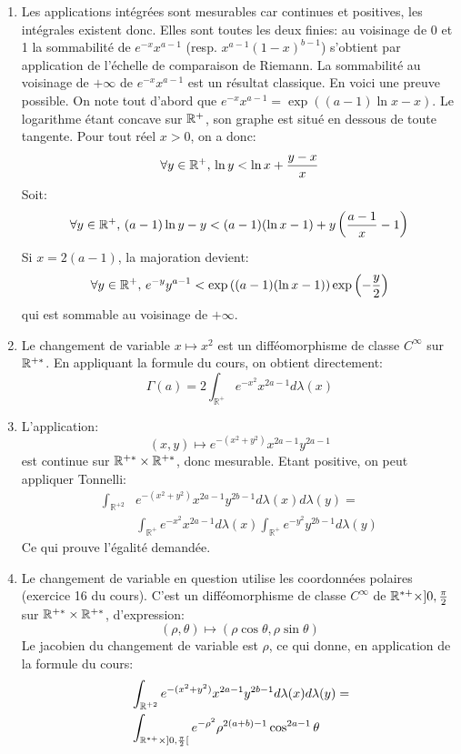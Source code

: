\documentclass[a4paper, 12pt]{amsart}
\begin{document}
\begin{enumerate}
 \item Les applications intégrées sont mesurables car continues et positives,
les intégrales existent donc. Elles sont toutes les deux finies: au voisinage
de 0 et 1 la sommabilité de $e^{-x}x^{a-1}$ (resp. $x^{a-1}(1-x)^{b-1}$)
s'obtient par application de l'échelle de comparaison de Riemann. La
sommabilité au voisinage de $+\infty$ de $e^{-x}x^{a-1}$ est un résultat
classique. En voici une preuve possible. On note tout d'abord que
$e^{-x}x^{a-1}=\exp\left((a-1)\ln x-x\right)$. Le logarithme étant concave sur
$\mathbb{R}^+$, son graphe est situé en dessous de toute tangente. Pour tout réel $x >
0$, on a donc:
\[
 \forall y \in \mathbb{R}^+, \, \ln y < \ln x + \frac{y-x}{x}
\]
Soit:
\[
\forall y \in \mathbb{R}^+, \, (a-1)\ln y -y < (a-1)(\ln x-1) +
y\left(\frac{a-1}{x}-1\right)
\]
Si $x=2(a-1)$, la majoration devient:
\[
 \forall y \in \mathbb{R}^+, \,  e^{-y}y^{a-1}< \exp\left((a-1)(\ln x-1)\right)
\exp\left(-\frac{y}{2}\right)
\]
qui est sommable au voisinage de $+\infty$.
\item Le changement de variable $x \mapsto x^2$ est un difféomorphisme de
classe $C^\infty$ sur $\mathbb{R}^{+*}$. En appliquant la formule du cours, on obtient
directement:
\[
 \Gamma(a) = 2 \int_{\mathbb{R}^+} e^{-x^2} x^{2a-1} d \lambda(x)
\]
\item L'application:
\[
 (x,y) \mapsto e^{-(x^2+y^2)}x^{2a-1}y^{2a-1}
\]
est continue sur $\mathbb{R}^{+*}\times \mathbb{R}^{+*}$, donc mesurable. Etant positive, on
peut appliquer Tonnelli:
\begin{align*}
  \int_{\mathbb{R}^{+2}}
& e^{-(x^2+y^2)}x^{2a-1}y^{2b-1}d\lambda(x) d\lambda(y) =  \\ &
\int_{\mathbb{R}^+} e^{-x^2} x^{2a-1} d \lambda(x) \int_{\mathbb{R}^+} e^{-y^2}
y^{2b-1} d \lambda(y)
\end{align*}
Ce qui prouve l'égalité demandée.
\item Le changement de variable en question utilise les coordonnées polaires
(exercice 16 du cours). C'est un difféomorphisme de classe $C^\infty$ de
$\mathbb{R}^{*+}\times ]0, \frac{\pi}{2}$ sur $\mathbb{R}^{+*}\times \mathbb{R}^{+*}$, d'expression:
\[
 \left(\rho,\theta\right) \mapsto \left(\rho \cos \theta, \rho \sin \theta 
\right)
\]
Le jacobien du changement de variable est $\rho$, ce qui donne, en application
de la formule du cours:
\begin{align*}
 & \int_{\mathbb{R}^{+2}}
e^{-(x^2+y^2)}x^{2a-1}y^{2b-1}d\lambda(x) d\lambda(y) = \\ &\int_{\R^{*+}\times
]0, \frac{\pi}{2}[} e^{-\rho^2}\rho^{2(a+b)-1} \cos^{2a-1}\theta

\end{align*}
\end{enumerate}
\end{document}
